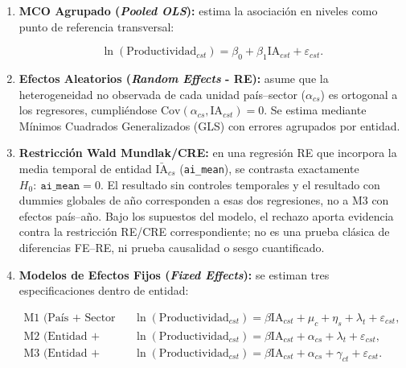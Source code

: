 \documentclass[12pt,a4paper]{article}
\begin{document}
\begin{enumerate}

    \item \textbf{MCO Agrupado (\textit{Pooled OLS}):} estima la asociación en niveles como punto de referencia transversal:

    \begin{equation}
      \ln(\text{Productividad}_{cst}) = \beta_0 + \beta_1 \text{IA}_{cst} + \varepsilon_{cst}.
    \end{equation}

    \item \textbf{Efectos Aleatorios (\textit{Random Effects} - RE):} asume que la heterogeneidad no observada de cada unidad país--sector ($\alpha_{cs}$) es ortogonal a los regresores, cumpliéndose $\text{Cov}(\alpha_{cs}, \text{IA}_{cst}) = 0$. Se estima mediante Mínimos Cuadrados Generalizados (GLS) con errores agrupados por entidad.

    \item \textbf{Restricción Wald Mundlak/CRE:} en una regresión RE que incorpora la media temporal de entidad $\bar{\text{IA}}_{cs}$ (\texttt{ai\_mean}), se contrasta exactamente $H_0:\ \texttt{ai\_mean}=0$. El resultado sin controles temporales y el resultado con dummies globales de año corresponden a esas dos regresiones, no a M3 con efectos país--año. Bajo los supuestos del modelo, el rechazo aporta evidencia contra la restricción RE/CRE correspondiente; no es una prueba clásica de diferencias FE--RE, ni prueba causalidad o sesgo cuantificado.

    \item \textbf{Modelos de Efectos Fijos (\textit{Fixed Effects}):} se estiman tres especificaciones dentro de entidad:

        \begin{align}
      \text{M1 (País + Sector + Año):} \quad &\ln(\text{Productividad}_{cst}) = \beta \text{IA}_{cst} + \mu_c + \eta_s + \lambda_t + \varepsilon_{cst}, \\
      \text{M2 (Entidad + Año):} \quad &\ln(\text{Productividad}_{cst}) = \beta \text{IA}_{cst} + \alpha_{cs} + \lambda_t + \varepsilon_{cst}, \\
      \text{M3 (Entidad + País--Año):} \quad &\ln(\text{Productividad}_{cst}) = \beta \text{IA}_{cst} + \alpha_{cs} + \gamma_{ct} + \varepsilon_{cst}.
    \end{align}

\end{enumerate}
\end{document}
